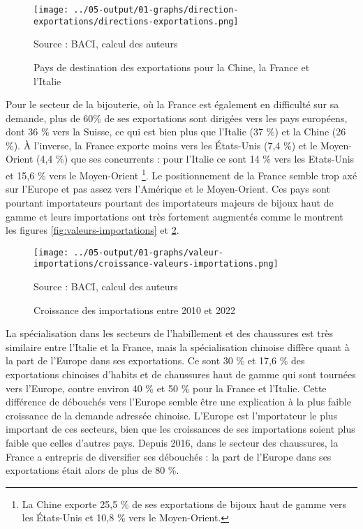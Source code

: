 \documentclass[french,10pt,a4paper]{article}
\begin{document}
\begin{figure}[!h]
  \centering
  \texttt{[image: ../05-output/01-graphs/direction-exportations/directions-exportations.png]}
  \captionsetup{justification=raggedright,singlelinecheck=false, font=small}
  \caption*{Source : BACI, calcul des auteurs}
  \captionsetup{justification=centering, singlelinecheck=true, font=normalsize}
  \caption{Pays de destination des exportations pour la Chine, la France et l'Italie}
  \label{fig:direction-exportations}
\end{figure}

Pour le secteur de la bijouterie, où la France est également en difficulté sur sa demande, plus de 60\% de ses exportations sont dirigées vers les pays européens, dont 36 \% vers la Suisse, ce qui est bien plus que l'Italie (37 \%) et la Chine (26 \%). À l'inverse, la France exporte moins vers les États-Unis (7,4 \%) et le Moyen-Orient (4,4 \%) que ses concurrents : pour l'Italie ce sont 14 \% vers les Etats-Unis et 15,6 \% vers le Moyen-Orient \footnote{La Chine exporte 25,5 \% de ses exportations de bijoux haut de gamme vers les États-Unis et 10,8 \% vers le Moyen-Orient.}. Le positionnement de la France semble trop axé sur l'Europe et pas assez vers l'Amérique et le Moyen-Orient. Ces pays sont pourtant importateurs pourtant des importateurs majeurs de bijoux haut de gamme et leurs importations ont très fortement augmentés comme le montrent les figures \ref{fig:valeurs-importations} et \ref{fig:croissance-valeurs-importations}.  

\begin{figure}[!h]
  \centering
  \texttt{[image: ../05-output/01-graphs/valeur-importations/croissance-valeurs-importations.png]}
  \captionsetup{justification=raggedright,singlelinecheck=false, font=small}
  \caption*{Source : BACI, calcul des auteurs}
  \captionsetup{justification=centering, singlelinecheck=true, font=normalsize}
  \caption{Croissance des importations entre 2010 et 2022}
  \label{fig:croissance-valeurs-importations}
\end{figure}

La spécialisation dans les secteurs de l'habillement et des chaussures est très similaire entre l'Italie et la France, mais la spécialisation chinoise diffère quant à la part de l'Europe dans ses exportations. Ce sont 30 \% et 17,6 \% des exportations chinoises d'habits et de chaussures haut de gamme qui sont tournées vers l'Europe, contre environ 40 \% et 50 \% pour la France et l’Italie. Cette différence de débouchés vers l'Europe semble être une explication à la plus faible croissance de la demande adressée chinoise. L'Europe est l'mportateur le plus important de ces secteurs, bien que les croissances de ses importations soient plus faible que celles d'autres pays. Depuis 2016, dans le secteur des chaussures, la France a entrepris de diversifier ses débouchés : la part de l'Europe dans ses exportations était alors de plus de 80 \%.
\end{document}

